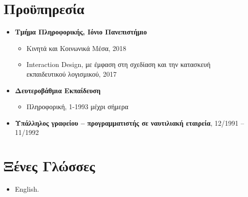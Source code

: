 \documentclass[%
    11pt,
  oneside
  ]{memoir}
\let\oldsection\section
\renewcommand{\section}[1]{%
  \oldsection{#1}
  \leavevmode
  \par
  \vspace{\dimexpr-\baselineskip-\parskip}
}
\begin{document}
\hypertarget{ux3c0ux3c1ux3bfux3cbux3c0ux3b7ux3c1ux3b5ux3c3ux3afux3b1}{%
\section{Προϋπηρεσία}\label{ux3c0ux3c1ux3bfux3cbux3c0ux3b7ux3c1ux3b5ux3c3ux3afux3b1}}

\begin{itemize}
\tightlist
\item
  \textbf{Τμήμα Πληροφορικής, Ιόνιο Πανεπιστήμιο}

  \begin{itemize}
  \tightlist
  \item
    Κινητά και Κοινωνικά Μέσα, 2018
  \item
    Interaction Design, με έμφαση στη σχεδίαση και την κατασκευή
    εκπαιδευτικού λογισμικού, 2017
  \end{itemize}
\item
  \textbf{Δευτεροβάθμια Εκπαίδευση}

  \begin{itemize}
  \tightlist
  \item
    Πληροφορική, 1-1993 μέχρι σήμερα
  \end{itemize}
\item
  \textbf{Υπάλληλος γραφείου -- προγραμματιστής σε ναυτιλιακή εταιρεία},
  12/1991 -- 11/1992
\end{itemize}

\hypertarget{ux3beux3adux3bdux3b5ux3c2-ux3b3ux3bbux3ceux3c3ux3c3ux3b5ux3c2}{%
\section{Ξένες
Γλώσσες}\label{ux3beux3adux3bdux3b5ux3c2-ux3b3ux3bbux3ceux3c3ux3c3ux3b5ux3c2}}

\begin{itemize}
\tightlist
\item
  English.
\end{itemize}
\end{document}
